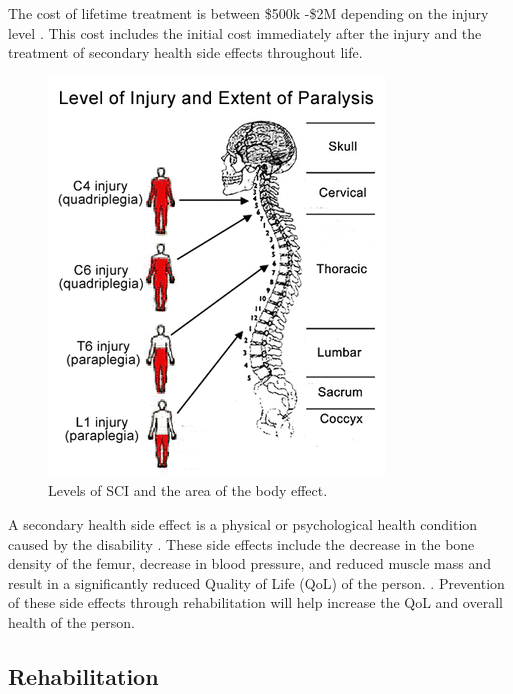 The cost of lifetime treatment is between \$500k -\$2M depending on the injury level \cite{mcdonald2002spinal}. This cost includes the initial cost immediately after the injury and the treatment of secondary health side effects throughout life.  

 

\begin{figure}
    \centering
    \includegraphics[scale=0.6]{images/background/SCI.png}
    \caption[Levels of SCI]{Levels of SCI and the area of the body effect. \cite{sadaka2012bradycardia}}
    \label{fig:SCILevels}
\end{figure}

A secondary health side effect is a physical or psychological health condition caused by the disability \cite{jensen2012secondary}. These side effects include the decrease in the bone density of the femur, decrease in blood pressure, and reduced muscle mass \cite{haisma2007complications} \cite{hitzig2010understanding} and result in a significantly reduced Quality of Life (QoL) of the person.  	\cite{craven2012impact}. Prevention of these side effects through rehabilitation will help increase the QoL and overall health of the person.  








\subsection{Rehabilitation}
\label{sec:rehab}

